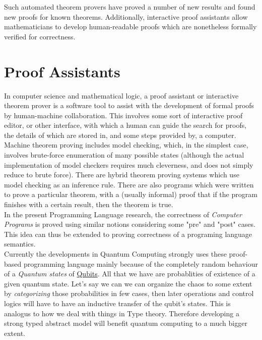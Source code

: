 Such automated theorem provers have proved a number of new results and found new proofs for known theorems. Additionally, interactive proof assistants allow mathematicians to develop human-readable proofs which are nonetheless formally verified for correctness.   


\section{Proof Assistants}

In computer science and mathematical logic, a proof assistant or interactive theorem prover is a software tool to assist with the development of formal proofs by human-machine collaboration. This involves some sort of interactive proof editor, or other interface, with which a human can guide the search for proofs, the details of which are stored in, and some steps provided by, a computer. \\

Machine theorem proving includes model checking, which, in the simplest case, involves brute-force enumeration of many possible states (although the actual implementation of model checkers requires much cleverness, and does not simply reduce to brute force). There are hybrid theorem proving systems which use model checking as an inference rule. There are also programs which were written to prove a particular theorem, with a (usually informal) proof that if the program finishes with a certain result, then the theorem is true.\\


\hfill \break In the present Programming Language research, the correctness of \textit{Computer Programs} is proved using similar notions considering some "pre" and "post" cases. This idea can thus be extended to proving correctness of a programing language semantics. \\

Currently the developments in Quantum Computing strongly uses these proof-based programming language mainly because of the completely random behaviour of a \textit{Quantum states} of \underline{Qubits}. All that we have are probablities of 
existence of a given quantum state. Let's say we can we can organize the chaos to some extent by \textit{categorizing} those probabilities in few cases, then later operations and control logics will have to have an inductive transfer of the qubit's states. This is analogus to how we deal with things in Type theory. Therefore developing a strong typed abstract model will benefit quantum computing to a much bigger extent.\\

